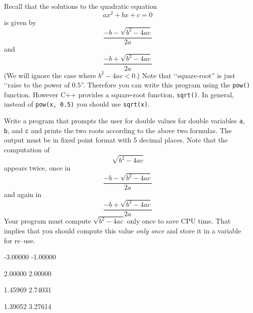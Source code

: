 Recall that the solutions to the quadratic equation
\[
a x^2 + b x + c = 0
\]
is given by
\[
\frac{-b - \sqrt{b^2 - 4ac}}{2a}
\]
and
\[
\frac{-b + \sqrt{b^2 - 4ac}}{2a}
\]
(We will ignore the case where 
$b^2 - 4ac < 0$.) 
Note that \lq\lq square-root'' is just \lq\lq raise to the power of $0.5$''.
Therefore you can write this program using the 
\verb!pow()! function. However C++ provides a square-root
function, \verb!sqrt()!. 
In general, instead of \verb!pow(x, 0.5)! you should use \verb!sqrt(x)!.

Write a program that prompts the user for double values for double variables 
\verb!a!, \verb!b!, and \verb!c! and prints the
two roots according to the above two formulas. 
The output must be in fixed point format with 5 decimal places. 
Note that the computation of
\[
\sqrt{b^2 - 4ac}
\]
appears twice, once in
\[
\frac{-b - \sqrt{b^2 - 4ac}}{2a}
\]
and again in
\[
\frac{-b + \sqrt{b^2 - 4ac}}{2a}
\]
Your program must compute 
$\sqrt{b^2 - 4ac}$ only once to save CPU time. 
That implies that you should compute this value \textit{only once}
and store it in a variable for re--use.


\resett
\nextt
\begin{console}[commandchars=\\\{\}]
-3.00000 -1.00000
\end{console}

\nextt
\begin{console}[commandchars=\\\{\}]
2.00000 2.00000
\end{console}

\nextt
\begin{console}[commandchars=\\\{\}]
1.45969 2.74031
\end{console}

\nextt
\begin{console}[commandchars=\\\{\}]
1.39052 3.27614
\end{console}


